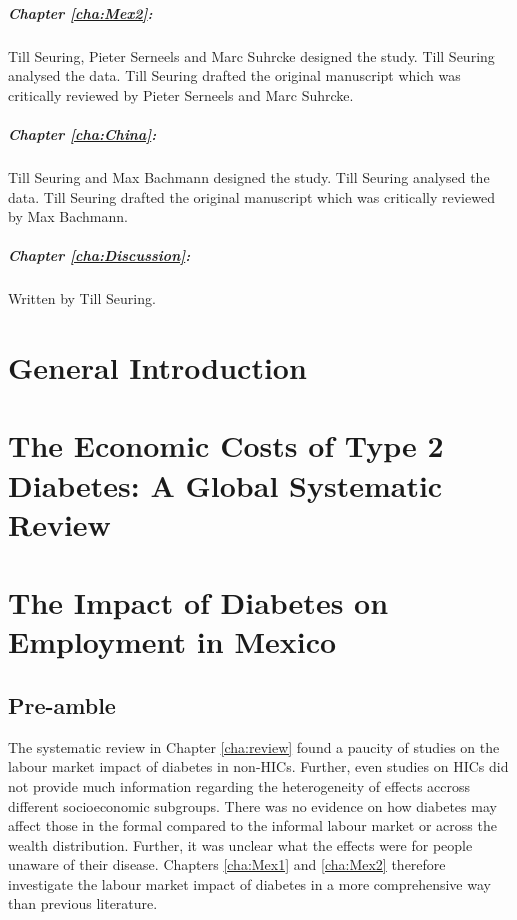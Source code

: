 \paragraph{Chapter \ref{cha:Mex2}:} Till Seuring, Pieter Serneels and Marc Suhrcke designed the study. Till Seuring analysed the data. Till Seuring drafted the original manuscript which was critically reviewed by Pieter Serneels and Marc Suhrcke.

\paragraph{Chapter \ref{cha:China}:} Till Seuring and Max Bachmann designed the study. Till Seuring analysed the data. Till Seuring drafted the original manuscript which was critically reviewed by Max Bachmann.

\paragraph{Chapter \ref{cha:Discussion}:} Written by Till Seuring.



\chapter{\label{cha:intro}General Introduction}

\acresetall  %
\chapter{\label{cha:review}The Economic Costs of Type 2 Diabetes: A Global Systematic Review}

\acresetall  %
\chapter{\label{cha:Mex1}The Impact of Diabetes on Employment in Mexico}
\section*{Pre-amble}

The systematic review in Chapter \ref{cha:review} found a paucity of studies on the labour market impact of diabetes in non-\acp{HIC}. Further, even studies on \acp{HIC} did not provide much information regarding the heterogeneity of effects accross different socioeconomic subgroups. There was no evidence on how diabetes may affect those in the formal compared to the informal labour market or across the wealth distribution. Further, it was unclear what the effects were for people unaware of their disease. Chapters \ref{cha:Mex1} and \ref{cha:Mex2} therefore investigate the labour market impact of diabetes in a more comprehensive way than previous literature.

